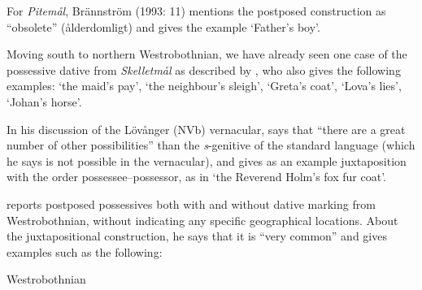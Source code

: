 
For \textit{Pitemål}, Brännström (1993: 11) mentions the postposed construction as “obsolete” (ålderdomligt) and gives the example  ‘Father’s boy’. 


Moving south to northern Westrobothnian, we have already seen one case of the possessive dative from \textit{Skelletmål} as described by \citet[22]{Marklund1976}, who also gives the following examples:  ‘the maid’s pay’,  ‘the neighbour’s sleigh’,  ‘Greta’s coat’,  ‘Lova’s lies’, ‘Johan’s horse’. 


In his discussion of the Lövånger (NVb) vernacular, \citet[208]{Holm1942} says that “there are a great number of other possibilities” than the \textit{s}{}-genitive of the standard language (which he says is not possible in the vernacular), and gives as an example juxtaposition with the order possessee–possessor, as in  ‘the Reverend Holm’s fox fur coat’. 


\citet[125]{Larsson1929} reports postposed possessives both with and without dative marking from Westrobothnian, without indicating any specific geographical locations. About the juxtapositional construction, he says that it is “very common” and gives examples such as the following:


\item 

Westrobothnian


